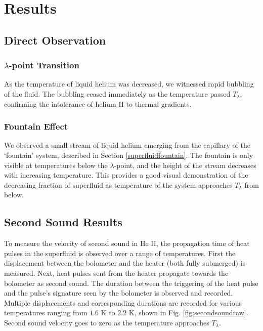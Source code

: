 
\section{Results}
\label{results}

\subsection{Direct Observation}
\subsubsection{$\lambda$-point Transition}
As the temperature of liquid helium was decreased, we witnessed rapid
bubbling of the fluid. The bubbling ceased immediately as the
temperature passed $T_{\lambda}$, confirming the intolerance of helium
II to thermal gradients.

\subsubsection{Fountain Effect}
We observed a small stream of liquid helium emerging from the
capillary of the `fountain' system, described in Section
\ref{superfluidfountain}. The fountain is only visible at temperatures
below the $\lambda$-point, and the height of the stream decreases with
increasing temperature. This provides a good visual demonstration of
the decreasing fraction of superfluid as temperature of the system
approaches $T_{\lambda}$ from below.

\subsection{Second Sound Results}
\label{secondsoundresults}

To measure the velocity of second sound in He II, the propagation time of heat pulses in the superfluid is observed over a range of temperatures. First the displacement between the bolometer and the heater (both fully submerged) is measured. Next, heat pulses sent from the heater propagate towards the bolometer as second sound. The duration between the triggering of the heat pulse and the pulse's signature seen by the bolometer is observed and recorded. Multiple displacements and corresponding durations are recorded for various temperatures ranging from $1.6$ K to $2.2$ K, shown in Fig. \ref{fig:secondsoundraw}. Second sound velocity goes to zero as the temperature approaches $T_{\lambda}$.


